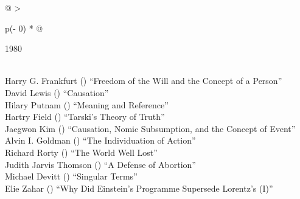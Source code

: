 \documentclass[
  10pt,
  letterpaper,
  DIV=11,
  numbers=noendperiod,
  twoside]{scrartcl}
\begin{document}
\begin{longtable}[]{@{}
  >{\raggedright\arraybackslash}p{(\columnwidth - 0\tabcolsep) * }@{}}

\caption{\label{tbl-top-ten-1971}Most cited articles published less than
ten years ago as of 1980.}

\tabularnewline

\toprule\noalign{}
\begin{minipage}[b]{\linewidth}\raggedright
1980
\end{minipage} \\
\midrule\noalign{}
\endhead
\bottomrule\noalign{}
\endlastfoot
Harry G. Frankfurt
()
``Freedom of the Will and the Concept of a Person'' \\
David Lewis
()
``Causation'' \\
Hilary Putnam
()
``Meaning and Reference'' \\
Hartry Field
()
``Tarski's Theory of Truth'' \\
Jaegwon Kim
()
``Causation, Nomic Subsumption, and the Concept of Event'' \\
Alvin I. Goldman
()
``The Individuation of Action'' \\
Richard Rorty
()
``The World Well Lost'' \\
Judith Jarvis Thomson
()
``A Defense of Abortion'' \\
Michael Devitt
()
``Singular Terms'' \\
Elie Zahar
()
``Why Did Einstein's Programme Supersede Lorentz's (I)'' \\

\end{longtable}
\end{document}
